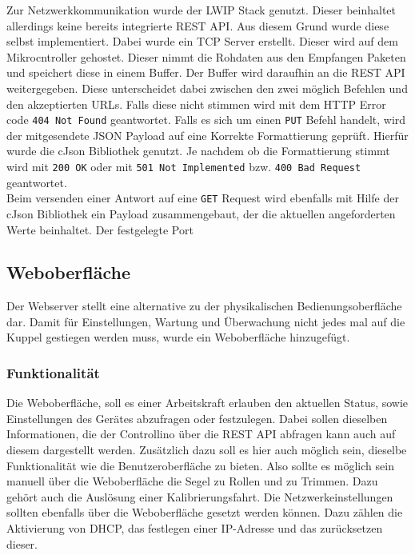 \noindent Zur Netzwerkkommunikation wurde der \ac{LWIP} Stack genutzt. Dieser beinhaltet allerdings keine bereits integrierte \ac{REST} \ac{API}. Aus diesem Grund wurde diese selbst implementiert. Dabei wurde ein \ac{TCP} Server erstellt. Dieser wird auf dem Mikrocntroller gehostet. Dieser nimmt die Rohdaten aus den Empfangen Paketen und speichert diese in einem Buffer. Der Buffer wird daraufhin an die \ac{REST} \ac{API} weitergegeben. Diese unterscheidet dabei zwischen den zwei möglich Befehlen und den akzeptierten \ac{URL}s. Falls diese nicht stimmen wird mit dem \ac{HTTP} Error code \verb|404 Not Found| geantwortet. Falls es sich um einen \verb|PUT| Befehl handelt, wird der mitgesendete JSON Payload auf eine Korrekte Formattierung geprüft. Hierfür wurde die cJson Bibliothek genutzt. Je nachdem ob die Formattierung stimmt wird mit \verb|200 OK| oder mit \verb|501 Not Implemented| bzw. \verb|400 Bad Request| geantwortet.\\

\noindent Beim versenden einer Antwort auf eine \verb|GET| Request wird ebenfalls mit Hilfe der cJson Bibliothek ein Payload zusammengebaut, der die aktuellen angeforderten Werte beinhaltet. Der festgelegte Port 
\subsection{Weboberfläche}
Der Webserver stellt eine alternative zu der physikalischen Bedienungsoberfläche dar. Damit für Einstellungen, Wartung und Überwachung nicht jedes mal auf die Kuppel gestiegen werden muss, wurde ein Weboberfläche hinzugefügt.
\subsubsection{Funktionalität}
Die Weboberfläche, soll es einer Arbeitskraft erlauben den aktuellen Status, sowie Einstellungen des Gerätes abzufragen oder festzulegen. Dabei sollen dieselben Informationen, die der Controllino über die \ac{REST} \ac{API} abfragen kann auch auf diesem dargestellt werden. Zusätzlich dazu soll es hier auch möglich sein, dieselbe Funktionalität wie die Benutzeroberfläche zu bieten. Also sollte es möglich sein manuell über die Weboberfläche die Segel zu Rollen und zu Trimmen. Dazu gehört auch die Auslösung einer Kalibrierungsfahrt.
Die Netzwerkeinstellungen sollten ebenfalls über die Weboberfläche gesetzt werden können. Dazu zählen die Aktivierung von DHCP, das festlegen einer IP-Adresse und das zurücksetzen dieser.
